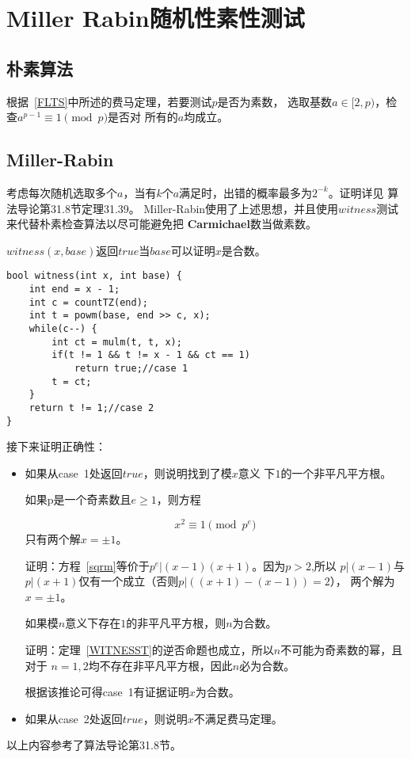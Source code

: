 \section{Miller Rabin随机性素性测试}
\subsection{朴素算法}
根据~\ref{FLTS}中所述的费马定理，若要测试$p$是否为素数，
选取基数$a\in [2,p)$，检查$a^{p-1}\equiv 1 \pmod{p}$是否对
所有的$a$均成立。
\subsection{Miller-Rabin}
考虑每次随机选取多个$a$，当有$k$个$a$满足时，出错的概率最多为$2^{-k}$。证明详见
算法导论\cite{ITA3}第31.8节定理31.39。
Miller-Rabin使用了上述思想，并且使用$witness$测试来代替朴素检查算法以尽可能避免把
{\bfseries Carmichael}数当做素数。

$witness(x,base)$返回$true$当$base$可以证明$x$是合数。
\begin{lstlisting}[title=witness]
bool witness(int x, int base) {
    int end = x - 1;
    int c = countTZ(end);
    int t = powm(base, end >> c, x);
    while(c--) {
        int ct = mulm(t, t, x);
        if(t != 1 && t != x - 1 && ct == 1)
            return true;//case 1
        t = ct;
    }
    return t != 1;//case 2
}
\end{lstlisting}
接下来证明正确性：
\begin{itemize}
	\item 如果从case~1处返回$true$，则说明找到了模$x$意义
            下$1$的一个非平凡平方根。

          \begin{theorem}\label{WITNESST}
              如果p是一个奇素数且$e\geq 1$，则方程

              \begin{equation}\label{sqrm}
                   x^2 \equiv 1 \pmod{p^e}
              \end{equation}
              只有两个解$x=\pm 1$。
	      \end{theorem}

          证明：方程~\ref{sqrm}等价于$p^e|(x-1)(x+1)$。因为$p>2$,所以
          $p|(x-1)$与$p|(x+1)$仅有一个成立（否则$p|((x+1)-(x-1))=2$），
          两个解为$x=\pm 1$。

	      \begin{inference}
		      如果模$n$意义下存在$1$的非平凡平方根，则$n$为合数。
	      \end{inference}

	      证明：定理~\ref{WITNESST}的逆否命题也成立，所以$n$不可能为奇素数的幂，且对于
	      $n=1,2$均不存在非平凡平方根，因此$n$必为合数。

	      根据该推论可得case~1有证据证明$x$为合数。
	\item 如果从case~2处返回$true$，则说明$x$不满足费马定理。
\end{itemize}
以上内容参考了算法导论\cite{ITA3}第31.8节。
